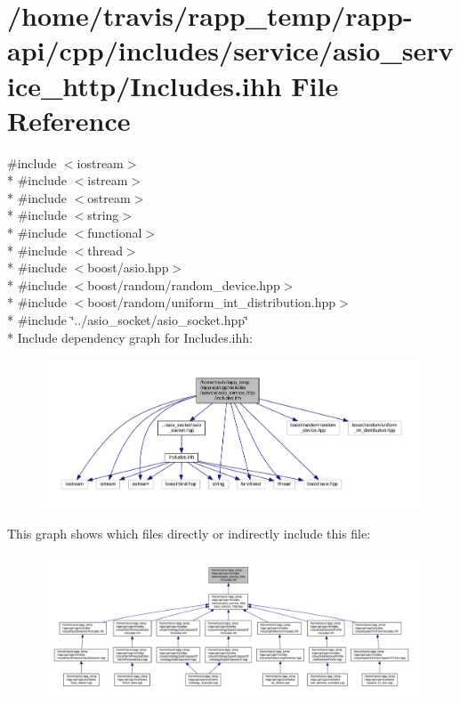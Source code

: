 \hypertarget{service_2asio__service__http_2Includes_8ihh}{\section{/home/travis/rapp\-\_\-temp/rapp-\/api/cpp/includes/service/asio\-\_\-service\-\_\-http/\-Includes.ihh File Reference}
\label{service_2asio__service__http_2Includes_8ihh}
}
{\ttfamily \#include $<$iostream$>$}\\*
{\ttfamily \#include $<$istream$>$}\\*
{\ttfamily \#include $<$ostream$>$}\\*
{\ttfamily \#include $<$string$>$}\\*
{\ttfamily \#include $<$functional$>$}\\*
{\ttfamily \#include $<$thread$>$}\\*
{\ttfamily \#include $<$boost/asio.\-hpp$>$}\\*
{\ttfamily \#include $<$boost/random/random\-\_\-device.\-hpp$>$}\\*
{\ttfamily \#include $<$boost/random/uniform\-\_\-int\-\_\-distribution.\-hpp$>$}\\*
{\ttfamily \#include \char`\"{}../asio\-\_\-socket/asio\-\_\-socket.\-hpp\char`\"{}}\\*
Include dependency graph for Includes.\-ihh\-:
\nopagebreak
\begin{figure}[H]
\begin{center}
\leavevmode
\includegraphics[width=350pt]{service_2asio__service__http_2Includes_8ihh__incl}
\end{center}
\end{figure}
This graph shows which files directly or indirectly include this file\-:
\nopagebreak
\begin{figure}[H]
\begin{center}
\leavevmode
\includegraphics[width=350pt]{service_2asio__service__http_2Includes_8ihh__dep__incl}
\end{center}
\end{figure}

